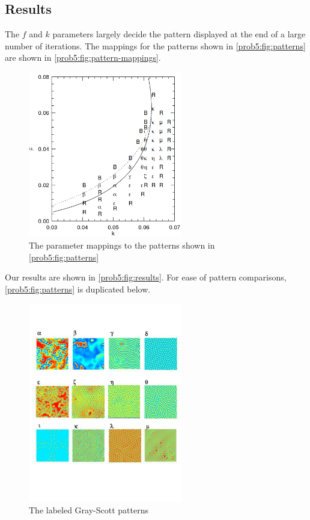 \subsection{Results}
The $f$ and $k$ parameters largely decide the pattern displayed at the end of a large number of iterations.
The mappings for the patterns shown in \autoref{prob5:fig:patterns} are shown in \autoref{prob5:fig:pattern-mappings}.
\begin{figure}[H]
    \centering
    \includegraphics[width=0.6\textwidth]{figures/reactions/pattern-mappings.png}
    \caption{The parameter mappings to the patterns shown in \autoref{prob5:fig:patterns}}\label{prob5:fig:pattern-mappings}
\end{figure}

Our results are shown in \autoref{prob5:fig:results}.
For ease of pattern comparisons, \autoref{prob5:fig:patterns} is duplicated below.

\begin{figure}[H]
    \centering
    \includegraphics[width=0.6\textwidth]{figures/reactions/patterns.jpg}
    \caption{The labeled Gray-Scott patterns}
\end{figure}

